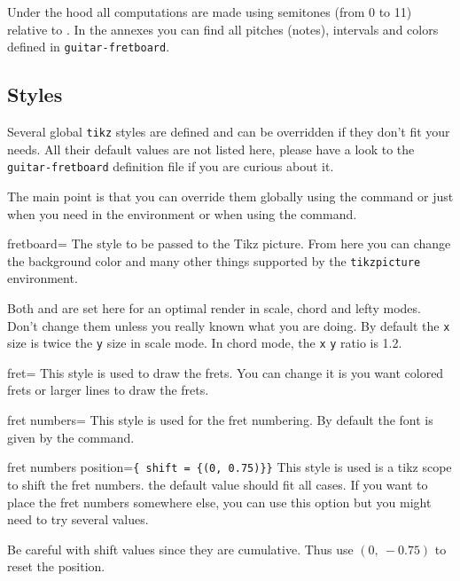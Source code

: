 \documentclass[a4paper]{article}
\newcommand{\pkg}[1]{\texttt{#1}}
\begin{document}
Under the hood all computations are made using semitones (from 0 to 11)
relative to \pC. In the annexes you can find all pitches (notes), intervals
and colors defined in \pkg{guitar-fretboard}.

\subsection{Styles}

Several global \pkg{tikz} styles are defined and can be overridden if they
don't fit your needs. All their default values are not listed here, please
have a look to the \pkg{guitar-fretboard} definition file if you are curious
about it.

The main point is that you can override them globally using the 
command or just when you need in the  environment or when using
the  command.

\begin{docKey}[tikz][]{fretboard}{=}{}
  The style to be passed to the Tikz picture. From here you can change the
  background color and many other things supported by the \pkg{tikzpicture}
  environment.

  Both  and  are set here for an optimal render in
  scale, chord and lefty modes. Don't change them unless you really known
  what you are doing. By default the \pkg{x} size is twice the \pkg{y} size
  in scale mode. In chord mode, the \pkg{x} \pkg{y} ratio is 1.2.
\end{docKey}

\begin{docKey}[tikz][]{fret}{=}{}
  This style is used to draw the frets. You can change it is you want
  colored frets or larger lines to draw the frets.
\end{docKey}

\begin{docKey}[tikz][]{fret numbers}{=}{}
  This style is used for the fret numbering. By default the font is given by
  the  command.
\end{docKey}

\begin{docKey}[tikz][]{fret numbers position}{=}{\texttt{\{ shift = \{(0, 0.75)\}\}}}
  This style is used is a tikz scope to shift the fret numbers. the default
  value should fit all cases. If you want to place the fret numbers
  somewhere else, you can use this option but you might need to try several
  values.

  Be careful with shift values since they are cumulative. Thus use
  $(0,~-0.75)$ to reset the position.
\end{docKey}
\end{document}

